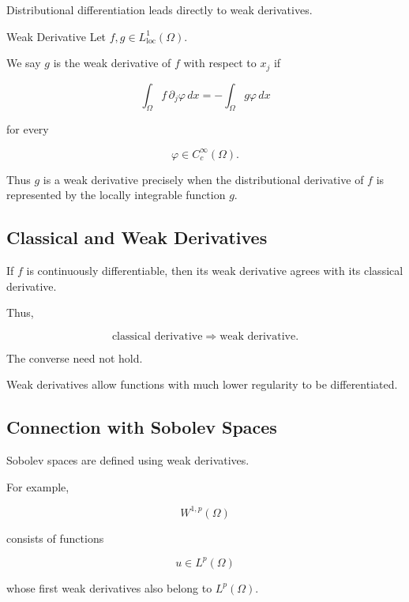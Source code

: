 Distributional differentiation leads directly to weak derivatives.

\begin{definitionbox}{Weak Derivative}
Let \(f,g\in L_{\mathrm{loc}}^1(\Omega)\).

We say \(g\) is the weak derivative of \(f\) with respect to \(x_j\) if

\[
\boxed{
\int_\Omega
f\,\partial_j\varphi\,dx
=
-
\int_\Omega
g\varphi\,dx
}
\]

for every

\[
\varphi\in C_c^\infty(\Omega).
\]
\end{definitionbox}

Thus \(g\) is a weak derivative precisely when the distributional
derivative of \(f\) is represented by the locally integrable function
\(g\).

\subsection{Classical and Weak Derivatives}
\label{subsec:classical-weak-derivatives}

If \(f\) is continuously differentiable, then its weak derivative agrees
with its classical derivative.

Thus,

\[
\boxed{
\text{classical derivative}
\Longrightarrow
\text{weak derivative}.
}
\]

The converse need not hold.

Weak derivatives allow functions with much lower regularity to be
differentiated.

\subsection{Connection with Sobolev Spaces}
\label{subsec:distribution-sobolev}

Sobolev spaces are defined using weak derivatives.

For example,

\[
\boxed{
W^{1,p}(\Omega)
}
\]

consists of functions

\[
u\in L^p(\Omega)
\]

whose first weak derivatives also belong to \(L^p(\Omega)\).

